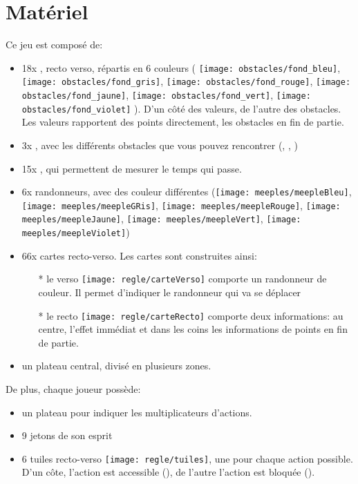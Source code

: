 \section*{Matériel} \label{sec:Matériel}

Ce jeu est composé de:
\begin{itemize}
\item 18x \jetonsObstacles, recto verso, répartis en 6 couleurs ( \texttt{[image: obstacles/fond\_bleu]}, 
\texttt{[image: obstacles/fond\_gris]}, \texttt{[image: obstacles/fond\_rouge]}, \texttt{[image: obstacles/fond\_jaune]}, \texttt{[image: obstacles/fond\_vert]}, \texttt{[image: obstacles/fond\_violet]} ). D'un côté des valeurs, de l'autre des obstacles. Les valeurs rapportent des points directement, les obstacles en fin de partie.
\item 3x \marqueursObstacles, avec les différents obstacles que vous pouvez rencontrer (\arbre, \tronc, \rocher)
\item 15x \jetonsMeteo, qui permettent de mesurer le temps qui passe.
\item 6x randonneurs, avec des couleur différentes (\texttt{[image: meeples/meepleBleu]}, \texttt{[image: meeples/meepleGRis]}, \texttt{[image: meeples/meepleRouge]}, \texttt{[image: meeples/meepleJaune]}, \texttt{[image: meeples/meepleVert]}, \texttt{[image: meeples/meepleViolet]})
\item 66x cartes recto-verso. Les cartes sont construites ainsi:
\begin{itemize}
\item[*] le verso \texttt{[image: regle/carteVerso]} comporte un randonneur de couleur. Il permet d'indiquer le randonneur qui va se déplacer
\item[*] le recto \texttt{[image: regle/carteRecto]} comporte deux informations: au centre, l'effet immédiat et dans les coins les informations de points en fin de partie.
\end{itemize}
\item un plateau central, divisé en plusieurs zones.
\end{itemize}

De plus, chaque joueur possède:
\begin{itemize}
\item un plateau pour indiquer les multiplicateurs d'actions.
\item 9 jetons de son esprit
\item 6 tuiles recto-verso \texttt{[image: regle/tuiles]}, une pour chaque action possible. D'un côte, l'action est accessible (\tuileActive), de l'autre l'action est bloquée (\tuileBloquee).
\end{itemize}

